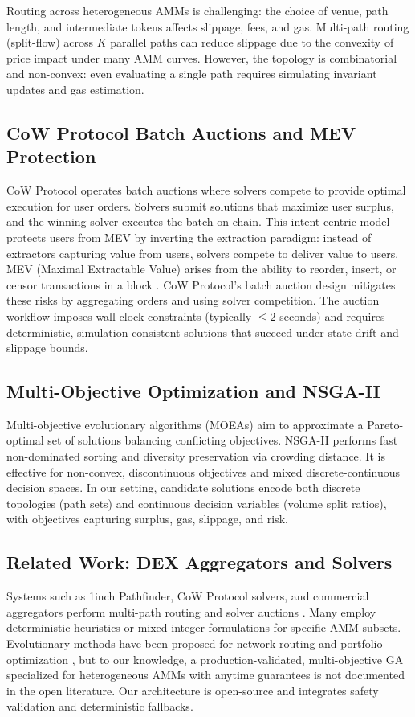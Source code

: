 \documentclass[11pt]{article}
\newcommand{\1}{\mathbf{1}}  %
\begin{document}
Routing across heterogeneous AMMs is challenging: the choice of venue, path length, and intermediate tokens affects slippage, fees, and gas. Multi-path routing (split-flow) across $K$ parallel paths can reduce slippage due to the convexity of price impact under many AMM curves. However, the topology is combinatorial and non-convex: even evaluating a single path requires simulating invariant updates and gas estimation.

\subsection{CoW Protocol Batch Auctions and MEV Protection}
CoW Protocol operates batch auctions where solvers compete to provide optimal execution for user orders. Solvers submit solutions that maximize user surplus, and the winning solver executes the batch on-chain. This intent-centric model protects users from MEV by inverting the extraction paradigm: instead of extractors capturing value from users, solvers compete to deliver value to users. MEV (Maximal Extractable Value) arises from the ability to reorder, insert, or censor transactions in a block \cite{daian2020flashboys2}. CoW Protocol's batch auction design mitigates these risks by aggregating orders and using solver competition. The auction workflow imposes wall-clock constraints (typically $\le 2$ seconds) and requires deterministic, simulation-consistent solutions that succeed under state drift and slippage bounds.

\subsection{Multi-Objective Optimization and NSGA-II}
Multi-objective evolutionary algorithms (MOEAs) aim to approximate a Pareto-optimal set of solutions balancing conflicting objectives. NSGA-II \cite{deb2002nsga2} performs fast non-dominated sorting and diversity preservation via crowding distance. It is effective for non-convex, discontinuous objectives and mixed discrete-continuous decision spaces. In our setting, candidate solutions encode both discrete topologies (path sets) and continuous decision variables (volume split ratios), with objectives capturing surplus, gas, slippage, and risk.

\subsection{Related Work: DEX Aggregators and Solvers}
Systems such as 1inch Pathfinder, CoW Protocol solvers, and commercial aggregators perform multi-path routing and solver auctions \cite{1inch, cowprotocol}. Many employ deterministic heuristics or mixed-integer formulations for specific AMM subsets. Evolutionary methods have been proposed for network routing and portfolio optimization \cite{geneticRouting,geneticPortfolio}, but to our knowledge, a production-validated, multi-objective GA specialized for heterogeneous AMMs with anytime guarantees is not documented in the open literature. Our architecture is open-source and integrates safety validation and deterministic fallbacks.
\end{document}
